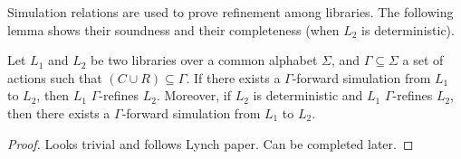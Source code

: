 Simulation relations are used to prove refinement among libraries. The following lemma shows their soundness and their completeness (when $L_2$ is deterministic).
\begin{lem}
Let $L_1$ and $L_2$ be two libraries over a common alphabet $\Sigma$, and $\Gamma\subseteq \Sigma$ a set of actions such that $(C\cup R)\subseteq \Gamma$. If there exists a $\Gamma$-forward simulation from $L_1$ to $L_2$, then $L_1$ $\Gamma$-refines $L_2$. Moreover, if $L_2$ is deterministic and $L_1$ $\Gamma$-refines $L_2$, then there exists a $\Gamma$-forward simulation from $L_1$ to $L_2$.
\end{lem}
\begin{proof}
Looks trivial and follows Lynch paper. Can be completed later.
\end{proof}



